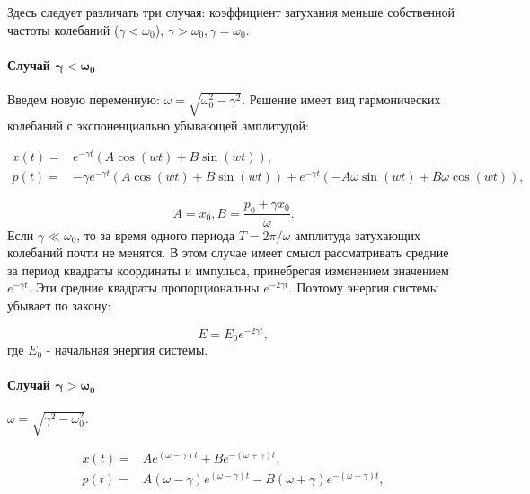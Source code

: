 \documentclass[11pt]{article}
\begin{document}
Здесь следует различать три случая: коэффициент затухания меньше
собственной частоты колебаний (\(\gamma < \omega_0\)),
\(\gamma > \omega_0, \gamma = \omega_0\).

\hypertarget{ux441ux43bux443ux447ux430ux439-mathbfgamma-omega_0}{%
\paragraph{\texorpdfstring{Случай
\(\mathbf{\gamma < \omega_0}\)}{Случай \textbackslash mathbf\{\textbackslash gamma \textless{} \textbackslash omega\_0\}}}\label{ux441ux43bux443ux447ux430ux439-mathbfgamma-omega_0}}

Введем новую переменную: \(\omega = \sqrt{\omega_0^2 - \gamma^2}.\)
Решение имеет вид гармонических колебаний с экспоненциально убывающей
амплитудой:

\begin{align}
    x(t) = & e^{-\gamma t} (A \cos(w t) + B \sin(w t)), \\
    p(t) = & -\gamma e^{-\gamma t} (A \cos(w t) + B \sin(w t)) + 
        e^{-\gamma t} (- A \omega \sin(w t) + B \omega \cos(w t)),
\end{align}

\[ A = x_0, B = \dfrac{p_0 + \gamma x_0}{\omega}. \] Если
\(\gamma \ll \omega_0\), то за время одного периода
\(T = 2 \pi / \omega\) амплитуда затухающих колебаний почти не менятся.
В этом случае имеет смысл рассматривать средние за период квадраты
координаты и импульса, принебрегая изменением значением
\(e^{-\gamma t}\). Эти средние квадраты пропорциональны
\(e^{-2 \gamma t}\). Поэтому энергия системы убывает по закону:

\begin{equation}
    E = E_0 e^{-2 \gamma t},
\end{equation} где \(E_0\) - начальная энергия системы.

\hypertarget{ux441ux43bux443ux447ux430ux439-mathbfgamma-omega_0-1}{%
\paragraph{\texorpdfstring{Случай
\(\mathbf{\gamma > \omega_0}\)}{Случай \textbackslash mathbf\{\textbackslash gamma \textgreater{} \textbackslash omega\_0\}}}\label{ux441ux43bux443ux447ux430ux439-mathbfgamma-omega_0-1}}

\(\omega = \sqrt{\gamma^2 - \omega_0^2}.\)

\begin{align}
    x(t) = & A e^{(\omega - \gamma) t} + B e^{-(\omega + \gamma) t}, \\
    p(t) = & A (\omega - \gamma) e^{(\omega - \gamma) t} - B (\omega + \gamma) e^{-(\omega + \gamma) t},
\end{align}
\end{document}
